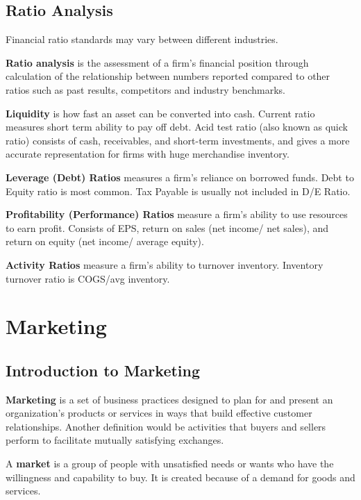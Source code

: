 \documentclass[english, 12pt]{article}
\begin{document}
\subsection{Ratio Analysis}
\begin{note}
Financial ratio standards may vary between different industries.
\end{note}
\begin{defn}
\textbf{Ratio analysis} is the assessment of a firm's financial position through calculation of the relationship between numbers reported compared to other ratios such as past results, competitors and industry benchmarks.
\end{defn}
\begin{rto}
\textbf{Liquidity} is how fast an asset can be  converted into cash. Current ratio measures short term ability to pay off debt. Acid test ratio (also known as quick ratio) consists of cash, receivables, and short-term investments, and gives a more accurate representation for firms with huge merchandise inventory. 
\end{rto}
\begin{rto}
\textbf{Leverage (Debt) Ratios} measures a firm's reliance on borrowed funds. Debt to Equity ratio is most common. Tax Payable is usually not included in D/E Ratio.
\end{rto}
\begin{rto}
\textbf{Profitability (Performance) Ratios} measure a firm's ability to use resources to earn profit. Consists of EPS, return on sales (net income/ net sales), and return on equity (net income/ average equity).
\end{rto}
\begin{rto}
\textbf{Activity Ratios} measure a firm's ability to turnover inventory. Inventory turnover ratio  is COGS/avg inventory.
\end{rto}

\section{Marketing}
\subsection{Introduction to Marketing}
\begin{defn}
\textbf{Marketing} is a set of business practices designed to plan for and present an organization's products or services in ways that build effective customer relationships. Another definition would be activities that buyers and sellers perform to facilitate mutually satisfying exchanges.
\end{defn}
\begin{defn}
A \textbf{market} is a group of people with unsatisfied needs or wants who have the willingness and capability to buy. It is created because of a demand for goods and services.
\end{defn}
\end{document}
